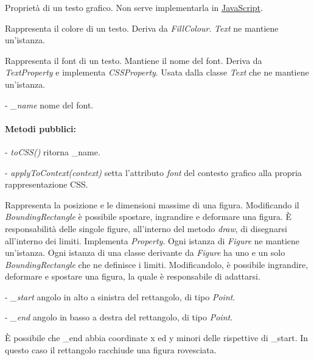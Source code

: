 Propriet\`a di un testo grafico. Non serve implementarla in \underline{JavaScript}.

Rappresenta il colore di un testo.
Deriva da \textit{FillColour}.
\textit{Text} ne mantiene un'istanza.

Rappresenta il font di un testo. Mantiene il nome del font.
Deriva da \textit{TextProperty} e implementa \textit{CSSProperty}.
Usata dalla classe \textit{Text} che ne mantiene un'istanza.
\begin{elencopuntato}[\subsubsecindent]
\item[-] \textit{{\_}name} nome del font.
\end{elencopuntato}
\paragraph{Metodi pubblici:}
\begin{elencopuntato}[\subsubsecindent]
\item[-] \textit{toCSS()} ritorna {\_}name.
\item[-] \textit{applyToContext(context)} setta l'attributo \textit{font} del contesto grafico alla propria rappresentazione CSS.
\end{elencopuntato}

Rappresenta la posizione e le dimensioni massime di una figura. Modificando il
\textit{BoundingRectangle} \`e possibile spostare, ingrandire e deformare una figura.
\`E responsabilit\`a delle singole figure, all'interno del metodo \textit{draw}, di disegnarsi all'interno dei limiti.
Implementa \textit{Property}. Ogni istanza di \textit{Figure} ne mantiene un'istanza.
Ogni istanza di una classe derivante da \textit{Figure} ha uno e un solo \textit{BoundingRectangle} che ne definisce i limiti. Modificandolo, \`e possibile ingrandire, deformare e spostare una figura, la quale \`e responsabile di adattarsi.
\begin{elencopuntato}[\subsubsecindent]
\item[-] \textit{{\_}start} angolo in alto a sinistra del rettangolo, di tipo \textit{Point}.
\item[-] \textit{{\_}end} angolo in basso a destra del rettangolo, di tipo \textit{Point}.
\end{elencopuntato}
\`E possibile che {\_}end abbia coordinate x ed y minori delle rispettive di {\_}start. In questo caso il rettangolo racchiude una figura rovesciata.
